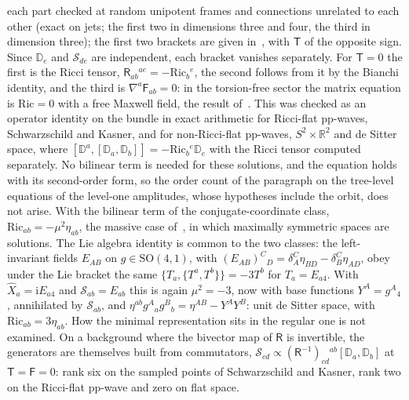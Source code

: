 each part checked at random unipotent frames and connections unrelated to each other (exact on jets; the first two in dimensions three and four, the third in dimension three); the first two brackets are given in~\cite{FurutaHanadaKawaiKimura2007}, with \(\mathsf T\) of the opposite sign. Since \(\mathbb D_e\) and \(\mathcal S_{de}\) are independent, each bracket vanishes separately. For \(\mathsf T=0\) the first is the Ricci tensor, \(\mathsf R_{ab}{}^{ae}=-\mathrm{Ric}_b{}^e\), the second follows from it by the Bianchi identity, and the third is \(\nabla^a\mathsf F_{ab}=0\): in the torsion-free sector the matrix equation is \(\mathrm{Ric}=0\) with a free Maxwell field, the result of~\cite{HanadaKawaiKimura2006}. This was checked as an operator identity on the bundle in exact arithmetic for Ricci-flat pp-waves, Schwarzschild and Kasner, and for non-Ricci-flat pp-waves, \(S^2\times\mathbb R^2\) and de Sitter space, where \([\mathbb D^a,[\mathbb D_a,\mathbb D_b]]=-\mathrm{Ric}_b{}^e\mathbb D_e\) with the Ricci tensor computed separately. No bilinear term is needed for these solutions, and the equation holds with its second-order form, so the order count of the paragraph on the tree-level equations of the level-one amplitudes, whose hypotheses include the orbit, does not arise. With the bilinear term of the conjugate-coordinate class, \(\mathrm{Ric}_{ab}=-\mu^2\eta_{ab}\), the massive case of~\cite{HanadaKawaiKimura2006,FurutaHanadaKawaiKimura2007}, in which maximally symmetric spaces are solutions. The Lie algebra identity is common to the two classes: the left-invariant fields \(E_{AB}\) on \(g\in\mathrm{SO}(4,1)\), with \((E_{AB})^C{}_D=\delta^C_A\eta_{BD}-\delta^C_B\eta_{AD}\), obey under the Lie bracket the same \(\{T_a,\{T^a,T^b\}\}=-3T^b\) for \(T_a=E_{a4}\). With \(\hat X_a=\mathrm iE_{a4}\) and \(\mathcal S_{ab}=E_{ab}\) this is again \(\mu^2=-3\), now with base functions \(Y^A=g^A{}_4\), annihilated by \(\mathcal S_{ab}\), and \(\eta^{ab}g^A{}_ag^B{}_b=\eta^{AB}-Y^AY^B\): unit de Sitter space, with \(\mathrm{Ric}_{ab}=3\eta_{ab}\). How the minimal representation sits in the regular one is not examined. On a background where the bivector map of \(\mathsf R\) is invertible, the generators are themselves built from commutators, \(\mathcal S_{cd}\propto(\mathsf R^{-1})_{cd}{}^{ab}[\mathbb D_a,\mathbb D_b]\) at \(\mathsf T=\mathsf F=0\): rank six on the sampled points of Schwarzschild and Kasner, rank two on the Ricci-flat pp-wave and zero on flat space.


